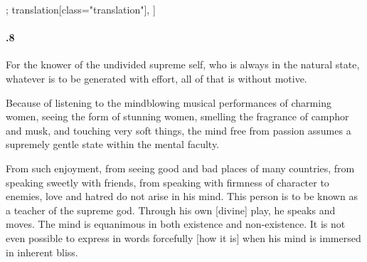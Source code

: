 \begin{alignment}[
  texts=edition[class="edition"];
  translation[class="translation"],
  ]
\begin{translation}
\begin{tlate}[58_8]
\paragraph{.8} For the knower of the undivided supreme self, who is always in the natural state, whatever is to be generated with effort, all of that is without motive.\\
\end{tlate}
\begin{tlate}[p58_03]
Because of listening to the mindblowing musical performances of charming women, seeing the form of stunning women, smelling the fragrance of camphor and musk, and touching very soft things, the mind free from passion assumes a supremely gentle state within the mental faculty.

From such enjoyment, from seeing good and bad places of many countries, from speaking sweetly with friends, from speaking with firmness of character to enemies, love and hatred do not arise in his mind. This person is to be known as a teacher of the supreme god. Through his own [divine] play, he speaks and moves. The mind is equanimous in both existence and non-existence. It is not even possible to express in words forcefully [how it is] when his mind is immersed in inherent bliss.
\flushpage 
    \end{tlate}
  \end{translation}
\end{alignment}
\pagebreak %
